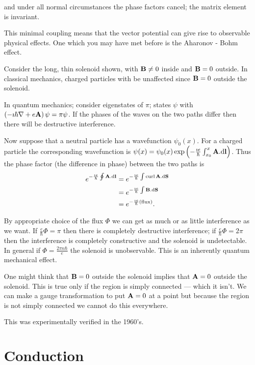 \documentclass{notes}
\newcommand{\B}{\vect{B}}
\DeclareMathOperator{\curl}{curl}
\begin{document}
and under all normal circumstances the phase factors cancel; the matrix
element is invariant.

This minimal coupling means that the vector potential can give rise
to observable physical effects.  One which you may have met before is
the Aharonov - Bohm effect.

Consider the long, thin solenoid shown, with $\B \neq 0$ inside and
$\B = 0$ outside.  In classical mechanics, charged particles with be
unaffected since $\B = 0$ outside the solenoid.

In quantum mechanics; consider eigenstates of $\pi$; states $\psi$
with $\left( - \imath \hbar \nabla + e \mathbf{A} \right) \psi = \pi \psi$.
If the phases of the waves on the two paths differ then there will be
destructive interference.

Now suppose that a neutral particle has a wavefunction $\psi_0(x)$.  For
a charged particle the corresponding wavefunction is
$\psi(x) = \psi_0(x) \exp \left( - \frac{\imath e}{\hbar}
\int_{x_0}^x \mathbf{A}.\mathbf{\mathrm{d} l} \right)$.  Thus the phase factor (the
difference in phase) between the two paths is
\begin{align*}
e^{-\frac{\imath e}{\hbar} \oint \vect{A}.\vect{\ud l}} &=
e^{-\frac{\imath e}{\hbar} \int \curl \vect{A}.\vect{\ud S}} \\
&= e^{-\frac{\imath e}{\hbar} \int \B.\vect{\ud S}} \\
&= e^{-\frac{\imath e}{\hbar} \left(\text{flux}\right)}.
\end{align*}

By appropriate choice of the flux $\Phi$ we can get as much or as little
interference as we want.  If $\frac{e}{\hbar} \Phi = \pi$ then there is
completely destructive interference; if $\frac{e}{\hbar} \Phi = 2 \pi$
then the interference is completely constructive and the solenoid is
undetectable.  In general if $\Phi = \frac{2 \pi n \hbar}{e}$ the
solenoid is unobservable.  This is an inherently quantum mechanical effect.

One might think that $\B = 0$ outside the solenoid implies that $\mathbf{A} = 0$
outside the solenoid.  This is true only if the region is simply connected
--- which it isn't.  We can make a gauge transformation to put $\mathbf{A} = 0$
at a point but because the region is not simply connected we cannot do this
everywhere.

This was experimentally verified in the 1960's.

\section{Conduction}
\end{document}

